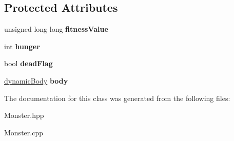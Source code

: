 \subsection*{Protected Attributes}
\begin{DoxyCompactItemize}
\item 
\hypertarget{class_monster_a06d47971b7f78a6a3867f15ff6d14688}{unsigned long long {\bfseries fitness\-Value}}\label{class_monster_a06d47971b7f78a6a3867f15ff6d14688}

\item 
\hypertarget{class_monster_a7dcdcbd51514aa5f77cfb317ad8f54ad}{int {\bfseries hunger}}\label{class_monster_a7dcdcbd51514aa5f77cfb317ad8f54ad}

\item 
\hypertarget{class_monster_af37d637fecf6ec0792fd008d7b3f32f9}{bool {\bfseries dead\-Flag}}\label{class_monster_af37d637fecf6ec0792fd008d7b3f32f9}

\item 
\hypertarget{class_monster_a6ca9674730dc6997e7e5fb6f5b019686}{\hyperlink{structdynamic_body}{dynamic\-Body} {\bfseries body}}\label{class_monster_a6ca9674730dc6997e7e5fb6f5b019686}

\end{DoxyCompactItemize}


The documentation for this class was generated from the following files\-:\begin{DoxyCompactItemize}
\item 
Monster.\-hpp\item 
Monster.\-cpp\end{DoxyCompactItemize}
